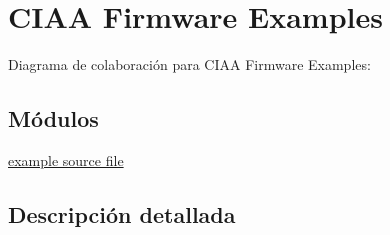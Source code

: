 \hypertarget{group___examples}{}\section{C\+I\+AA Firmware Examples}
\label{group___examples}
Diagrama de colaboración para C\+I\+AA Firmware Examples\+:
\subsection*{Módulos}
\begin{DoxyCompactItemize}
\item 
\hyperlink{group___main}{example source file}
\end{DoxyCompactItemize}


\subsection{Descripción detallada}
